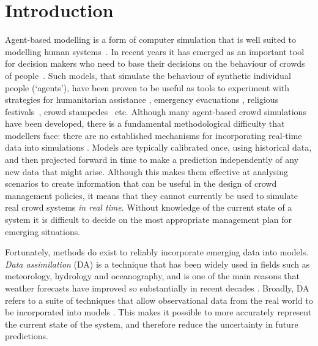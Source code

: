 \section{Introduction\label{introduction}}

Agent-based modelling is a form of computer simulation that is well suited to modelling human systems~\citep{bonabeau_agent_2002,  farmer_economy_2009}. In recent years it has emerged as an important tool for decision makers who need to base their decisions on the behaviour of crowds of people~\citep{henein_agentbased_2005}. Such models, that simulate the behaviour of synthetic individual people (`agents'), have been proven to be useful as tools to experiment with strategies for humanitarian assistance \citep{crooks_gis_2013}, emergency evacuations \citep{ren_agentbased_2009, schoenharl_design_2011}, religious festivals~\citep{zainuddin_simulating_2009}, crowd stampedes~\citep{helbing_simulating_2000} etc. Although many agent-based crowd simulations have been developed, there is a fundamental methodological difficulty that modellers face: there are no established mechanisms for incorporating real-time data into simulations \citep{lloyd_exploring_2016, wang_data_2015, ward_dynamic_2016}. Models are typically calibrated once, using historical data, and then projected forward in time to make a prediction independently of any new data that might arise. Although this makes them effective at analysing scenarios to create information that can be useful in the design of crowd management policies, it means that they cannot currently be used to simulate real crowd systems \textit{in real time}. Without knowledge of the current state of a system it is difficult to decide on the most appropriate management plan for emerging situations.

Fortunately, methods do exist to reliably incorporate emerging data into models. \textit{Data assimilation} (DA) is a technique that has been widely used in fields such as meteorology, hydrology and oceanography, and is one of the main reasons that weather forecasts have improved so substantially in recent decades \citep{kalnay_atmospheric_2003}. Broadly, DA refers to a suite of techniques that allow observational data from the real world to be incorporated into models \citep{lewis_dynamic_2006}. This makes it possible to more accurately represent the current state of the system, and therefore reduce the uncertainty in future predictions.

